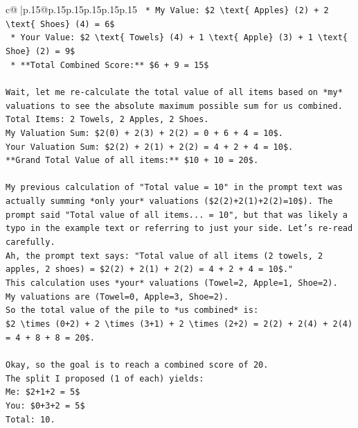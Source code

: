 \documentclass{article}
\begin{document}
{\begin{supertabular}{c@{$\;$}|p{.15\linewidth}@{}p{.15\linewidth}p{.15\linewidth}p{.15\linewidth}p{.15\linewidth}p{.15\linewidth}}
{{{\texttt{    *   My Value: \$2 \textbackslash{}text\{ Apples\} (2) + 2 \textbackslash{}text\{ Shoes\} (4) = 6\$} \\
\texttt{    *   Your Value: \$2 \textbackslash{}text\{ Towels\} (4) + 1 \textbackslash{}text\{ Apple\} (3) + 1 \textbackslash{}text\{ Shoe\} (2) = 9\$} \\
\texttt{    *   **Total Combined Score:** \$6 + 9 = 15\$} \\
\\ 
\texttt{Wait, let me re{-}calculate the total value of all items based on *my* valuations to see the absolute maximum possible sum for us combined.} \\
\texttt{Total Items: 2 Towels, 2 Apples, 2 Shoes.} \\
\texttt{My Valuation Sum: \$2(0) + 2(3) + 2(2) = 0 + 6 + 4 = 10\$.} \\
\texttt{Your Valuation Sum: \$2(2) + 2(1) + 2(2) = 4 + 2 + 4 = 10\$.} \\
\texttt{**Grand Total Value of all items:** \$10 + 10 = 20\$.} \\
\\ 
\texttt{My previous calculation of "Total value = 10" in the prompt text was actually summing *only your* valuations (\$2(2)+2(1)+2(2)=10\$). The prompt said "Total value of all items... = 10", but that was likely a typo in the example text or referring to just your side. Let's re{-}read carefully.} \\
\texttt{Ah, the prompt text says: "Total value of all items (2 towels, 2 apples, 2 shoes) = \$2(2) + 2(1) + 2(2) = 4 + 2 + 4 = 10\$."} \\
\texttt{This calculation uses *your* valuations (Towel=2, Apple=1, Shoe=2).} \\
\texttt{My valuations are (Towel=0, Apple=3, Shoe=2).} \\
\texttt{So the total value of the pile to *us combined* is:} \\
\texttt{\$2 \textbackslash{}times (0+2) + 2 \textbackslash{}times (3+1) + 2 \textbackslash{}times (2+2) = 2(2) + 2(4) + 2(4) = 4 + 8 + 8 = 20\$.} \\
\\ 
\texttt{Okay, so the goal is to reach a combined score of 20.} \\
\texttt{The split I proposed (1 of each) yields:} \\
\texttt{Me: \$2+1+2 = 5\$} \\
\texttt{You: \$0+3+2 = 5\$} \\
\texttt{Total: 10.} \\
}}}
\end{supertabular}}
\end{document}
